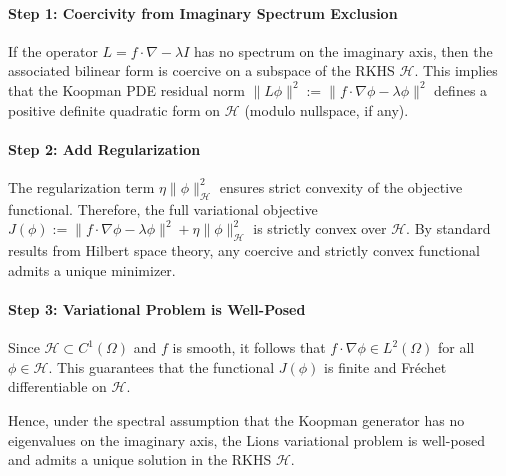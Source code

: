 \documentclass[11pt]{article}
\theoremstyle{plain}
\begin{document}
\paragraph{Step 1: Coercivity from Imaginary Spectrum Exclusion}
If the operator \( L = f \cdot \nabla - \lambda I \) has no spectrum on the imaginary axis, then the associated bilinear form is coercive on a subspace of the RKHS \( \mathcal{H} \).  This implies that the Koopman PDE residual norm $ \| L \phi \|^2 := \| f \cdot \nabla \phi - \lambda \phi \|^2$ defines a positive definite quadratic form on \( \mathcal{H} \) (modulo nullspace, if any).

\paragraph{Step 2: Add Regularization}
The regularization term  $ \eta \| \phi \|_{\mathcal{H}}^2$
ensures strict convexity of the objective functional. Therefore, the full variational objective
$J(\phi) := \| f \cdot \nabla \phi - \lambda \phi \|^2 + \eta \| \phi \|_{\mathcal{H}}^2 $ is strictly convex over \( \mathcal{H} \).  By standard results from Hilbert space theory, any coercive and strictly convex functional admits a unique minimizer.

\paragraph{Step 3: Variational Problem is Well-Posed}
Since \( \mathcal{H} \subset C^1(\Omega) \) and \( f \) is smooth, it follows that \( f \cdot \nabla \phi \in L^2(\Omega) \) for all \( \phi \in \mathcal{H} \). This guarantees that the functional \( J(\phi) \) is finite and Fréchet differentiable on \( \mathcal{H} \).

 
Hence, under the spectral assumption that the Koopman generator has no eigenvalues on the imaginary axis, the Lions variational problem is well-posed and admits a unique solution in the RKHS \( \mathcal{H} \).
\end{document}
